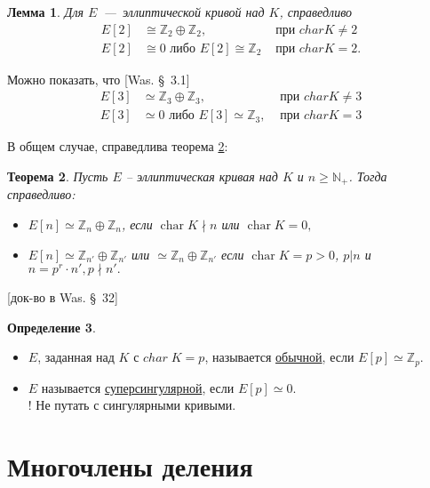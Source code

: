 \documentclass[12pt]{article}
\newcommand{\N}{{{\mathbb N}}}
\newcommand{\Z}{{{\mathbb Z}}}
\newtheorem{theorem}{Теорема}
\newtheorem{lemma}[theorem]{Лемма}
\theoremstyle{definition}
\newtheorem{definition}[theorem]{Определение}
\theoremstyle{definition}
\theoremstyle{definition}
\begin{document}
\begin{lemma}
	\label{lemm_01}
	Для $E$~---~эллиптической кривой над $K$, справедливо
	\begin{align*}
	E\left[ 2 \right] &\cong {\Z_2} \oplus {\Z_2}, &\text{ при }charK \ne 2 \\
	E\left[ 2 \right] &\cong 0 \text{ либо } E\left[ 2 \right] \cong {\Z_2} & \text{ при } char K = 2.
	\end{align*}
\end{lemma}

Можно показать, что [Was. \S~3.1]
    \begin{align*}
    E\left[ 3 \right] &\simeq {\Z_3} \oplus {\Z_3}, & {\text{ при }}char K \ne 3 \\
    E\left[ 3 \right] &\simeq 0 \text{ либо } E\left[ 3 \right] \simeq \Z_3, & {\text{ при }} char K = 3
    \end{align*}

В общем случае, справедлива теорема \ref{theor_02}:

\begin{theorem}
	\label{theor_02}
	Пусть $E$ -- эллиптическая кривая над $K$ и $n \geqslant {\N_+}$. Тогда справедливо:
	\begin{itemize}
		\item $E[n] \simeq \Z_n \oplus \Z_n$, если $\operatorname{char} K \nmid n$ или $\operatorname{char} K = 0,$
		\item $E[n] \simeq \Z_{n'} \oplus \Z_{n'}$ или $\simeq \Z_n \oplus \Z_{n'}$ если $\operatorname{char} K = p > 0$, $p|n$
		и $n = p^r \cdot n', p \nmid n'.$
	\end{itemize}
\end{theorem}
[док-во в Was. \S~32]

\begin{definition}
	\label{def_03}
	$ $
	\begin{itemize}
	\item $E$, заданная над $K$ с $char\;K = p$, называется \underline{обычной}, если $E[p] \simeq {\Z_p}$.

	\item $E$ называется \underline{суперсингулярной}, если $E[p] \simeq 0$.\\
	! Не путать с сингулярными кривыми.
	\end{itemize}
\end{definition}

\section{Многочлены деления}
\end{document}
